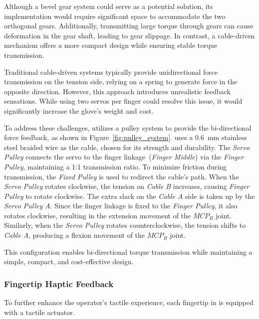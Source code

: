 Although a bevel gear system could serve as a potential solution, its implementation would require significant space to accommodate the two orthogonal gears. Additionally, transmitting large torque through gears can cause deformation in the gear shaft, leading to gear slippage. In contrast, a cable-driven mechanism offers a more compact design while ensuring stable torque transmission.

Traditional cable-driven systems typically provide unidirectional force transmission on the tension side, relying on a spring to generate force in the opposite direction. However, this approach introduces unrealistic feedback sensations. While using two servos per finger could resolve this issue, it would significantly increase the glove's weight and cost. 



To address these challenges, \oursystem utilizes a pulley system to provide the bi-directional force feedback, as shown in Figure~\ref{fig:pulley_system}.
%
\oursystem uses a 0.6~mm stainless steel braided wire as the cable, chosen for its strength and durability. The \textit{Servo Pulley} connects the servo to the finger linkage~(\textit{Finger Middle}) via the \textit{Finger Pulley}, maintaining a 1:1 transmission ratio. To minimize friction during transmission, the \textit{Fixed Pulley} is used to redirect the cable’s path.
%
When the \textit{Servo Pulley} rotates clockwise, the tension on \textit{Cable B} increases, causing \textit{Finger Pulley} to rotate clockwise. The extra slack on the \textit{Cable A} side is taken up by the \textit{Servo Pulley A}. Since the finger linkage is fixed to the \textit{Finger Pulley}, it also rotates clockwise, resulting in the extension movement of the $MCP_B$ joint. Similarly, when the \textit{Servo Pulley} rotates counterclockwise, the tension shifts to \textit{Cable A}, producing a flexion movement of the $MCP_B$ joint.

This configuration enables bi-directional torque transmission while maintaining a simple, compact, and cost-effective design.

\vspace{2mm}
\subsubsection{\textbf{Fingertip Haptic Feedback}}
\leavevmode

To further enhance the operator’s tactile experience, each fingertip in \oursystem is equipped with a tactile actuator. 

